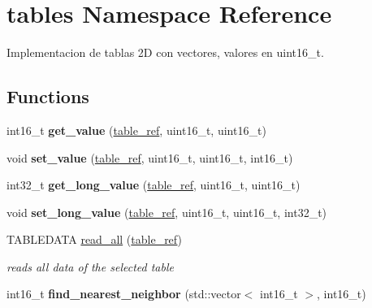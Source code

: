 \hypertarget{namespacetables}{}\section{tables Namespace Reference}
\label{namespacetables}


Implementacion de tablas 2D con vectores, valores en uint16\+\_\+t.  


\subsection*{Functions}
\begin{DoxyCompactItemize}
\item 
\mbox{\label{namespacetables_ad6abd6279ebdfd1813de8dee11e8d06c}} 
int16\+\_\+t {\bfseries get\+\_\+value} (\hyperlink{structtable__ref}{table\+\_\+ref}, uint16\+\_\+t, uint16\+\_\+t)
\item 
\mbox{\label{namespacetables_afdeac8e88a25e9a65a4afd6a6f881f20}} 
void {\bfseries set\+\_\+value} (\hyperlink{structtable__ref}{table\+\_\+ref}, uint16\+\_\+t, uint16\+\_\+t, int16\+\_\+t)
\item 
\mbox{\label{namespacetables_a8bb312dd55d1189bd4ceb6847087f9f5}} 
int32\+\_\+t {\bfseries get\+\_\+long\+\_\+value} (\hyperlink{structtable__ref}{table\+\_\+ref}, uint16\+\_\+t, uint16\+\_\+t)
\item 
\mbox{\label{namespacetables_a55cb401646e4582c598f0ed53f4bcfd7}} 
void {\bfseries set\+\_\+long\+\_\+value} (\hyperlink{structtable__ref}{table\+\_\+ref}, uint16\+\_\+t, uint16\+\_\+t, int32\+\_\+t)
\item 
T\+A\+B\+L\+E\+D\+A\+TA \hyperlink{namespacetables_a8a1bab94b65aabe4f2b226cdac58b41f}{read\+\_\+all} (\hyperlink{structtable__ref}{table\+\_\+ref})
\begin{DoxyCompactList}\small\item\em reads all data of the selected table \end{DoxyCompactList}\item 
\mbox{\label{namespacetables_a37dd35c842046812cd0a6983866e5c73}} 
int16\+\_\+t {\bfseries find\+\_\+nearest\+\_\+neighbor} (std\+::vector$<$ int16\+\_\+t $>$, int16\+\_\+t)
\item 

\end{DoxyCompactItemize}
